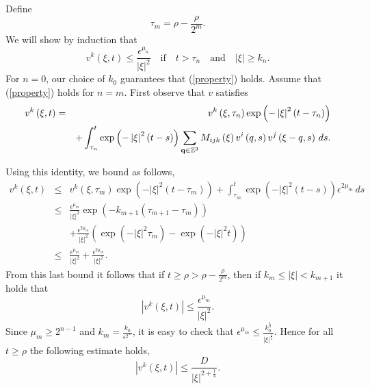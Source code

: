 \documentclass{amsart}
\begin{document}
Define
\[
\tau_m=\rho-\frac{\rho}{2^m}.
\]
We will show by induction that
\begin{equation}
\tag{P}
\label{property}
v^k\left(\xi,t\right)\leq \frac{\epsilon^{\mu_n}}{\left|\xi\right|^2}
\quad\mbox{if} \quad t>\tau_n\quad\mbox{and}\quad \left|\xi\right|\geq k_n.
\end{equation}
For $n=0$, our choice of $k_0$ guarantees that (\ref{property}) holds. Assume
that (\ref{property}) holds for $n=m$. First observe that $v$ satisfies 
\begin{eqnarray*}
v^k\left(\xi,t\right)&=&
v^k\left(\xi,\tau_n\right)\exp\left(-\left|\xi\right|^2\left(t-\tau_n\right)\right)\\\notag
&&
+\int_{\tau_n}^t\exp\left(-\left|\xi\right|^2\left(t-s\right)\right)\sum_{\mathbf{q}\in\mathbb{Z}^3}
M_{ijk}\left(\xi\right)v^i\left(q,s\right)v^j\left(\xi-q,s\right)\, ds.
\end{eqnarray*}

Using this identity, we bound as follows,
\begin{eqnarray*}
v^k\left(\xi,t\right)&\leq& v^k\left(\xi,\tau_m\right)\exp\left(-\left|\xi\right|^2\left(t-\tau_m\right)\right)+
\int_{\tau_m}^t \exp\left(-\left|\xi\right|^2\left(t-s\right)\right)\epsilon^{2\mu_m}\,ds\\
&\leq& \frac{\epsilon^{\mu_m}}{\left|\xi\right|^2}\exp\left(-k_{m+1}\left(\tau_{m+1}-\tau_m\right)\right)\\
&&+
\frac{\epsilon^{2\mu_m}}{\left|\xi\right|^2}
\left(\exp\left(-\left|\xi\right|^2 \tau_m\right)-\exp\left(-\left|\xi\right|^2 t\right)\right)\\
&\leq& \frac{\epsilon^{\mu_m}}{\left|\xi\right|^2}+\frac{\epsilon^{2\mu_m}}{\left|\xi\right|^2}.
\end{eqnarray*}
From this last bound it follows that if $t\geq \rho>\rho-\frac{\rho}{2^m}$, 
then if $k_m\leq\left|\xi\right|<k_{m+1}$ it holds that
\[
\left|v^k\left(\xi,t\right)\right|\leq \frac{\epsilon^{\mu_m}}{\left|\xi\right|^2}.
\]
Since $\mu_m\geq 2^{n-1}$ and $k_m=\frac{k_0}{\epsilon^{2^m}}$, 
it is easy to check that $\epsilon^{\mu_m}\leq \frac{k_0^{\frac{1}{4}}}{\left|\xi\right|^{\frac{1}{4}}}$.
Hence for all $t\geq \rho$ the following estimate holds,
\[
\left|v^k\left(\xi,t\right)\right|\leq \frac{D}{\left|\xi\right|^{2+\frac{1}{4}}}.
\]
\end{document}
